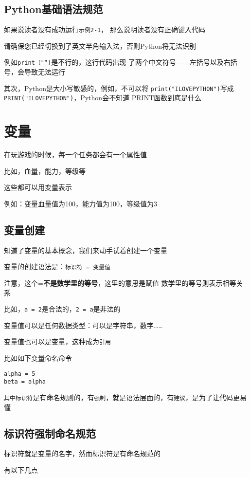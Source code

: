 \documentclass{book}
\begin{document}
\section{Python基础语法规范}

\indent 如果说读者没有成功运行\verb|示例2-1|，
那么说明读者没有正确键入代码


请确保您已经切换到了英文半角输入法，否则Python将无法识别


例如\verb|print（"“)|是不行的，这行代码出现
了两个中文符号——左括号以及右括号，会导致无法运行


其次，Python是大小写敏感的，例如，不可以将
\verb|print("ILOVEPYTHON")|写成
\verb|PRINT("ILOVEPYTHON")|，Python会不知道
PRINT函数到底是什么


\chapter{变量}
\indent 在玩游戏的时候，每一个任务都会有一个属性值


比如，血量，能力，等级等


这些都可以用变量表示


例如：变量血量值为100，能力值为100，等级值为3
\section{变量创建}
\indent 知道了变量的基本概念，我们来动手试着创建一个变量


变量的创建语法是：\verb|标识符 = 变量值|


注意，这个=\textbf{不是数学里的等号}，这里的意思是赋值
数学里的等号则表示相等关系


比如，\verb|a = 2|是合法的，\verb|2 = a|是非法的


变量值可以是任何数据类型：可以是字符串，数字……


变量值也可以是变量，这种成为\verb|引用|


比如如下变量命名命令


\begin{verbatim}
alpha = 5
beta = alpha
\end{verbatim}


\verb|其中标识符|是有命名规则的，有\verb|强制|，就是语法层面的，有\verb|建议|，是为了让代码更易懂
\section{标识符强制命名规范}
标识符就是变量的名字，然而标识符是有命名规范的


有以下几点
\end{document}
